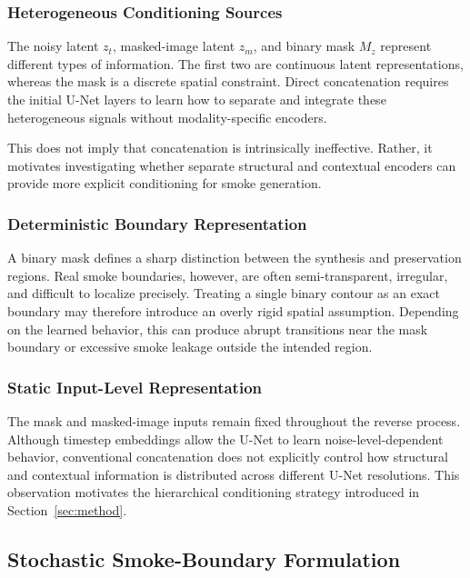 \documentclass[journal]{IEEEtran}
\begin{document}
\subsubsection{Heterogeneous Conditioning Sources}

The noisy latent \(z_t\), masked-image latent \(z_m\), and binary mask
\(M_z\) represent different types of information. The first two are
continuous latent representations, whereas the mask is a discrete
spatial constraint. Direct concatenation requires the initial U-Net
layers to learn how to separate and integrate these heterogeneous
signals without modality-specific encoders.

This does not imply that concatenation is intrinsically ineffective.
Rather, it motivates investigating whether separate structural and
contextual encoders can provide more explicit conditioning for smoke
generation.

\subsubsection{Deterministic Boundary Representation}

A binary mask defines a sharp distinction between the synthesis and
preservation regions. Real smoke boundaries, however, are often
semi-transparent, irregular, and difficult to localize precisely.
Treating a single binary contour as an exact boundary may therefore
introduce an overly rigid spatial assumption. Depending on the learned
behavior, this can produce abrupt transitions near the mask boundary or
excessive smoke leakage outside the intended region.

\subsubsection{Static Input-Level Representation}

The mask and masked-image inputs remain fixed throughout the reverse
process. Although timestep embeddings allow the U-Net to learn
noise-level-dependent behavior, conventional concatenation does not
explicitly control how structural and contextual information is
distributed across different U-Net resolutions. This observation
motivates the hierarchical conditioning strategy introduced in
Section~\ref{sec:method}.


\subsection{Stochastic Smoke-Boundary Formulation}
\label{subsec:boundary_uncertainty}
\end{document}
